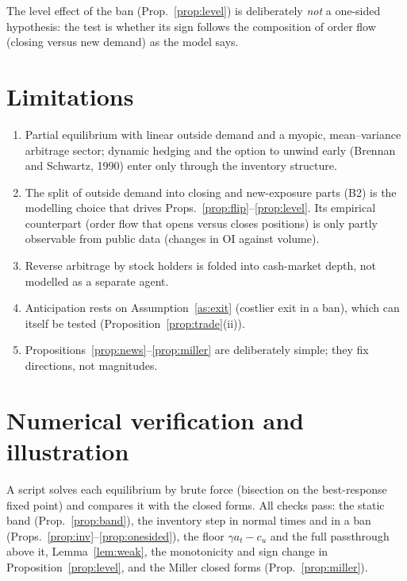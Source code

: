 The level effect of the ban (Prop.~\ref{prop:level}) is deliberately \emph{not} a one-sided hypothesis: the test is whether
its sign follows the composition of order flow (closing versus new demand) as the model says.

\section{Limitations}
\begin{enumerate}[leftmargin=1.6em,itemsep=1pt]
\item Partial equilibrium with linear outside demand and a myopic, mean--variance arbitrage sector; dynamic hedging and
the option to unwind early (Brennan and Schwartz, 1990) enter only through the inventory structure.
\item The split of outside demand into closing and new-exposure parts (B2) is the modelling choice that drives
Props.~\ref{prop:flip}--\ref{prop:level}. Its empirical counterpart (order flow that opens versus closes positions) is only
partly observable from public data (changes in OI against volume).
\item Reverse arbitrage by stock holders is folded into cash-market depth, not modelled as a separate agent.
\item Anticipation rests on Assumption~\ref{as:exit} (costlier exit in a ban), which can itself be tested
(Proposition~\ref{prop:trade}(ii)).
\item Propositions~\ref{prop:news}--\ref{prop:miller} are deliberately simple; they fix directions, not magnitudes.
\end{enumerate}

\section{Numerical verification and illustration}\label{app:num}
A script solves each equilibrium by brute force (bisection on the best-response fixed point) and compares it
with the closed forms. All checks pass: the static band (Prop.~\ref{prop:band}),
the inventory step in normal times and in a ban (Props.~\ref{prop:inv}--\ref{prop:onesided}), the floor
$\gamma a_t-c_u$ and the full passthrough above it, Lemma~\ref{lem:weak}, the monotonicity and sign change in
Proposition~\ref{prop:level}, and the Miller closed forms (Prop.~\ref{prop:miller}).

